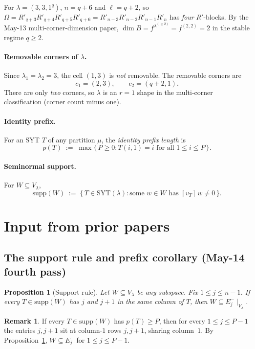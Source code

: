 \documentclass[11pt]{article}
\newtheorem{proposition}[theorem]{Proposition}
\theoremstyle{definition}
\newtheorem{remark}[theorem]{Remark}
\newcommand{\Om}{\Omega}
\newcommand{\supp}{\mathrm{supp}}
\newcommand{\SYT}{\mathrm{SYT}}
\begin{document}
For $\lambda = (3, 3, 1^q)$, $n = q + 6$ and $\ell = q + 2$, so
$\Om = R'_{q+3}R'_{q+4}R'_{q+5}R'_{q+6} = R'_{n-3}R'_{n-2}R'_{n-1}R'_n$
has \emph{four} $R'$-blocks.  By the May-13 multi-corner-dimension paper,
$\dim B = f^{\lambda^{(\ge 2)}} = f^{(2, 2)} = 2$ in the stable regime
$q \ge 2$.

\paragraph{Removable corners of $\lambda$.}
Since $\lambda_1 = \lambda_2 = 3$, the cell $(1, 3)$ is \emph{not}
removable.  The removable corners are
\[
   c_1 = (2, 3), \qquad c_2 = (q+2, 1).
\]
There are only \emph{two} corners, so $\lambda$ is an $r = 1$ shape in
the multi-corner classification (corner count minus one).

\paragraph{Identity prefix.}  For an SYT $T$ of any partition $\mu$,
the \emph{identity prefix length} is
\[
   p(T) \;:=\; \max\{\,P \ge 0 : T(i, 1) = i \text{ for all }
   1 \le i \le P\,\}.
\]

\paragraph{Seminormal support.}  For $W \subseteq V_\lambda$,
\[
   \supp(W) \;:=\; \{\,T \in \SYT(\lambda) : \text{some } w \in W
   \text{ has } [v_T]\,w \ne 0\,\}.
\]

\section{Input from prior papers}\label{sec:input}

\subsection{The support rule and prefix corollary (May-14 fourth pass)}

\begin{proposition}[Support rule]\label{prop:support-rule}
Let $W \subseteq V_\lambda$ be any subspace.  Fix $1 \le j \le n-1$.
If every $T \in \supp(W)$ has $j$ and $j+1$ in the same column of $T$,
then $W \subseteq E_j^-\!\mid_{V_\lambda}$.
\end{proposition}

\begin{remark}\label{rem:prefix-implies-Ej-}
If every $T \in \supp(W)$ has $p(T) \ge P$, then for every
$1 \le j \le P - 1$ the entries $j, j+1$ sit at column-$1$ rows
$j, j+1$, sharing column~$1$.  By Proposition~\ref{prop:support-rule},
$W \subseteq E_j^-$ for $1 \le j \le P - 1$.
\end{remark}
\end{document}
